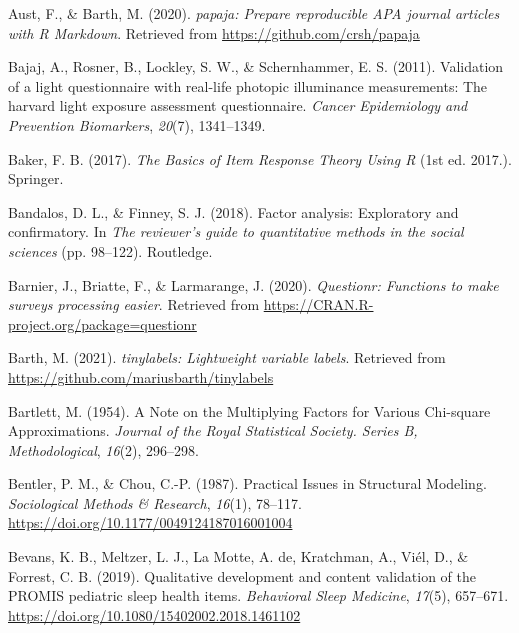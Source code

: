 \documentclass[
  english,
  man]{apa6}
\newlength{\cslhangindent}
\newlength{\cslentryspacingunit} %
\newenvironment{CSLReferences}[2] %
 {%
  \setlength{\parindent}{0pt}
  \ifodd #1
  \let\oldpar\par
  \def\par{\hangindent=\cslhangindent\oldpar}
  \fi
  \setlength{\parskip}{#2\cslentryspacingunit}
 }%
 {}
\begin{document}
\hypertarget{refs}{}
\begin{CSLReferences}{1}{0}
\leavevmode{}%
Aust, F., \& Barth, M. (2020). \emph{{papaja}: {Prepare} reproducible {APA} journal articles with {R Markdown}}. Retrieved from \url{https://github.com/crsh/papaja}

\leavevmode{}%
Bajaj, A., Rosner, B., Lockley, S. W., \& Schernhammer, E. S. (2011). Validation of a light questionnaire with real-life photopic illuminance measurements: The harvard light exposure assessment questionnaire. \emph{Cancer Epidemiology and Prevention Biomarkers}, \emph{20}(7), 1341--1349.

\leavevmode{}%
Baker, F. B. (2017). \emph{The {Basics} of {Item Response Theory Using R}} (1st ed. 2017.). {Springer}.

\leavevmode{}%
Bandalos, D. L., \& Finney, S. J. (2018). Factor analysis: {Exploratory} and confirmatory. In \emph{The reviewer's guide to quantitative methods in the social sciences} (pp. 98--122). {Routledge}.

\leavevmode{}%
Barnier, J., Briatte, F., \& Larmarange, J. (2020). \emph{Questionr: Functions to make surveys processing easier}. Retrieved from \url{https://CRAN.R-project.org/package=questionr}

\leavevmode{}%
Barth, M. (2021). \emph{{tinylabels}: Lightweight variable labels}. Retrieved from \url{https://github.com/mariusbarth/tinylabels}

\leavevmode{}%
Bartlett, M. (1954). A {Note} on the {Multiplying Factors} for {Various Chi}-square {Approximations}. \emph{Journal of the Royal Statistical Society. Series B, Methodological}, \emph{16}(2), 296--298.

\leavevmode{}%
Bentler, P. M., \& Chou, C.-P. (1987). Practical {Issues} in {Structural Modeling}. \emph{Sociological Methods \& Research}, \emph{16}(1), 78--117. \url{https://doi.org/10.1177/0049124187016001004}

\leavevmode{}%
Bevans, K. B., Meltzer, L. J., La Motte, A. de, Kratchman, A., Viél, D., \& Forrest, C. B. (2019). Qualitative development and content validation of the PROMIS pediatric sleep health items. \emph{Behavioral Sleep Medicine}, \emph{17}(5), 657--671. \url{https://doi.org/10.1080/15402002.2018.1461102}


\end{CSLReferences}
\end{document}
